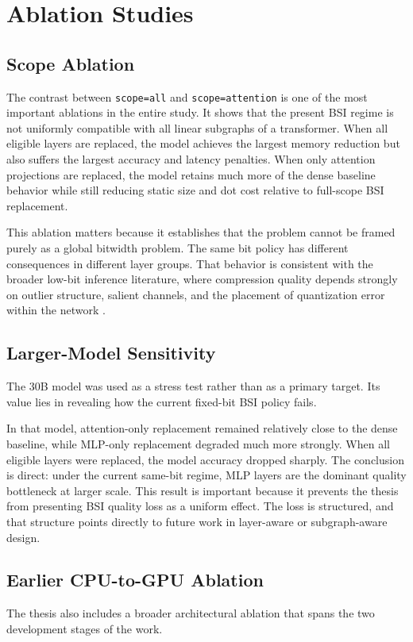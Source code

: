 \chapter{Ablation Studies}

\section{Scope Ablation}
The contrast between \texttt{scope=all} and \texttt{scope=attention} is one of the most important ablations in the entire study. It shows that the present BSI regime is not uniformly compatible with all linear subgraphs of a transformer. When all eligible layers are replaced, the model achieves the largest memory reduction but also suffers the largest accuracy and latency penalties. When only attention projections are replaced, the model retains much more of the dense baseline behavior while still reducing static size and dot cost relative to full-scope BSI replacement.

This ablation matters because it establishes that the problem cannot be framed purely as a global bitwidth problem. The same bit policy has different consequences in different layer groups. That behavior is consistent with the broader low-bit inference literature, where compression quality depends strongly on outlier structure, salient channels, and the placement of quantization error within the network \cite{gupta2015limitedprecision,llmint8,awq,smoothquant}.

\section{Larger-Model Sensitivity}
The 30B model was used as a stress test rather than as a primary target. Its value lies in revealing how the current fixed-bit BSI policy fails.

In that model, attention-only replacement remained relatively close to the dense baseline, while MLP-only replacement degraded much more strongly. When all eligible layers were replaced, the model accuracy dropped sharply. The conclusion is direct: under the current same-bit regime, MLP layers are the dominant quality bottleneck at larger scale. This result is important because it prevents the thesis from presenting BSI quality loss as a uniform effect. The loss is structured, and that structure points directly to future work in layer-aware or subgraph-aware design.

\section{Earlier CPU-to-GPU Ablation}
The thesis also includes a broader architectural ablation that spans the two development stages of the work.

